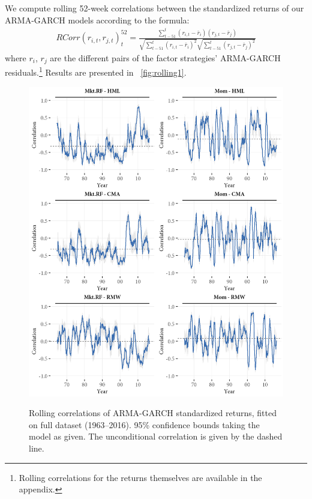 We compute rolling 52-week correlations between the standardized returns of our ARMA-GARCH models according to the formula: 
\begin{align}
    RCorr(r_{i, t}, r_{j, t})_t^{52} = \frac{\sum^{t}_{t-51}(r_{i, t} - \bar{r}_i)(r_{j,t} - \bar{r}_j)}{\sqrt{\sum^{t}_{t-51} (r_{i,t} - \bar{r}_i)^2} \sqrt{\sum^{t}_{t-51} (r_{j,t} - \bar{r}_j)^2}}
\end{align}
where $r_i$, $r_j$ are the different pairs of the factor strategies' ARMA-GARCH residuals.\footnote{Rolling correlations for the returns themselves are available in the appendix.} Results are presented in ~\autoref{fig:rolling1}.
\begin{figure}[!ht]
  \centering

  \caption{Rolling correlations of ARMA-GARCH standardized returns, fitted on full dataset (1963--2016). 95\% confidence bounds taking the model as given. The unconditional correlation is given by the dashed line.}
  
  \includegraphics[scale=1]{graphics/rolling1.png}
  \label{fig:rolling1}
\end{figure}
